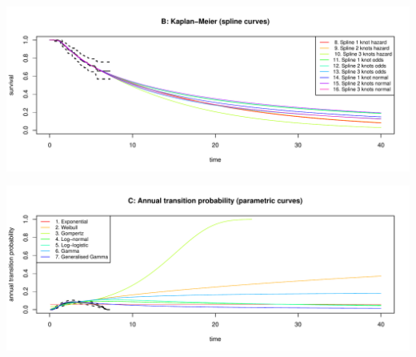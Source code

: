 \documentclass[
]{article}
\begin{document}
\begin{flushleft}\includegraphics[height=0.29\textheight]{Images/validate_extrapolation1-2} \end{flushleft}

\begin{flushleft}\includegraphics[height=0.29\textheight]{Images/validate_extrapolation1-3} \end{flushleft}
\end{document}
